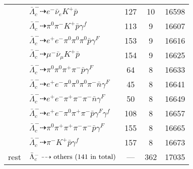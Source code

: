 \documentclass[landscape]{article}
\newcounter{rownumbers}
\newcommand\rn{\stepcounter{rownumbers}\arabic{rownumbers}}
\newcommand{\EOL}{\\} %
\newcommand{\topoTags}[1]{#1} %
\begin{document}
\begin{longtable}{clccc}
\rn & $ \bar{\Lambda}_{c}^{-} \dashrightarrow e^{-} \bar{\nu}_{e} K^{+} \bar{p} $ & \topoTags{127 & }10 & 16598 \EOL

\rn & $ \bar{\Lambda}_{c}^{-} \dashrightarrow \pi^{0} \pi^{-} K^{+} \bar{p} \gamma^{f} $ & \topoTags{113 & }9 & 16607 \EOL

\rn & $ \bar{\Lambda}_{c}^{-} \dashrightarrow e^{+} e^{-} \pi^{0} \pi^{0} \pi^{0} \bar{p} \gamma^{F} $ & \topoTags{153 & }9 & 16616 \EOL

\rn & $ \bar{\Lambda}_{c}^{-} \dashrightarrow \mu^{-} \bar{\nu}_{\mu} K^{+} \bar{p} $ & \topoTags{154 & }9 & 16625 \EOL

\rn & $ \bar{\Lambda}_{c}^{-} \dashrightarrow \pi^{0} \pi^{0} \pi^{+} \pi^{-} \bar{p} \gamma^{F} $ & \topoTags{64 & }8 & 16633 \EOL

\rn & $ \bar{\Lambda}_{c}^{-} \dashrightarrow e^{+} e^{-} \pi^{0} \pi^{0} \pi^{0} \pi^{-} \bar{n} \gamma^{F} $ & \topoTags{45 & }8 & 16641 \EOL

\rn & $ \bar{\Lambda}_{c}^{-} \dashrightarrow e^{+} e^{-} \pi^{+} \pi^{-} \pi^{-} \bar{n} \gamma^{F} $ & \topoTags{50 & }8 & 16649 \EOL

\rn & $ \bar{\Lambda}_{c}^{-} \dashrightarrow e^{+} e^{-} \pi^{0} \pi^{+} \pi^{-} \bar{p} \gamma^{F} \gamma^{f} $ & \topoTags{108 & }8 & 16657 \EOL

\rn & $ \bar{\Lambda}_{c}^{-} \dashrightarrow \pi^{0} \pi^{+} \pi^{+} \pi^{-} \pi^{-} \bar{p} \gamma^{F} $ & \topoTags{155 & }8 & 16665 \EOL

\rn & $ \bar{\Lambda}_{c}^{-} \dashrightarrow \pi^{-} K^{+} \bar{p} \gamma^{f} $ & \topoTags{157 & }8 & 16673 \EOL

rest & $ \bar{\Lambda}_{c}^{-} \dashrightarrow \rm{others \  (141 \  in \  total)} $ & \topoTags{--- & }362 & 17035 \\ \hline

\end{longtable}

\clearpage
\end{document}
